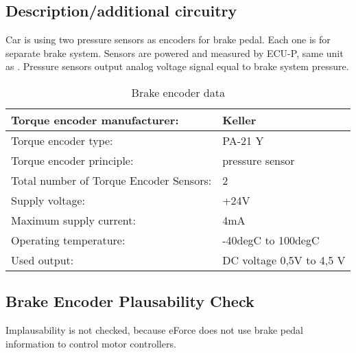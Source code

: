 \subsection{Description/additional circuitry}
Car is using two pressure sensors as encoders for brake pedal. Each one is for separate brake system. Sensors are powered and measured by ECU-P, same unit as \label{sec:TorqueEncoder}. Pressure sensors output analog voltage signal equal to brake system pressure. 


\begin{table}[H]
	\centering
	\caption{Brake encoder data}
	\begin{tabularx}{\textwidth}{|X|X|}
		\hline
		Torque encoder manufacturer: &  Keller \\[\TableSize]\hline
		Torque encoder type: & PA-21 Y \\[\TableSize]\hline
		Torque encoder principle: & pressure sensor \\[\TableSize]\hline
		Total number of Torque Encoder Sensors: & 2 \\[\TableSize]\hline
		Supply voltage: & +24V \\[\TableSize]\hline
		Maximum supply current: &  4mA  \\[\TableSize]\hline
		Operating temperature: & -40degC to 100degC \\[\TableSize]\hline
		Used output: & DC voltage 0,5V to 4,5 V \\[\TableSize]\hline
	\end{tabularx}%
	\label{tab:brake-general}%
\end{table}%

\subsection{Brake Encoder Plausability Check}
Implausability is not checked, because eForce does not use brake pedal information to control motor controllers.

%
%




